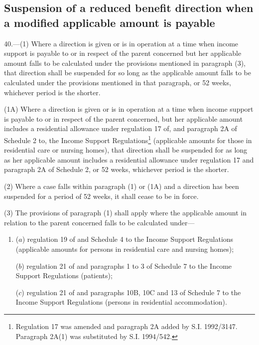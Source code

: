 \documentclass[a4paper,12pt]{article}
\begin{document}

\subsection[40. Suspension of a reduced benefit direction when a modified applicable amount is payable]{Suspension of a reduced benefit direction when a modified applicable amount is payable}

40.—(1) Where a direction is given or is in operation at a time when income support is payable to or in respect of the parent concerned but her applicable amount falls to be calculated under the provisions mentioned in paragraph (3), that direction shall be suspended for so long as the applicable amount falls to be calculated under the provisions mentioned in that paragraph, or 52 weeks, whichever period is the shorter.

(1A) Where a direction is given or is in operation at a time when income support is payable to or in respect of the parent concerned, but her applicable amount includes a residential allowance under regulation 17 of, and paragraph 2A of Schedule 2 to, the Income Support Regulations\footnote{\frenchspacing Regulation 17 was amended and paragraph 2A added by S.I. 1992/3147. Paragraph 2A(1) was substituted by S.I. 1994/542.} (applicable amounts for those in residential care or nursing homes), that direction shall be suspended for as long as her applicable amount includes a residential allowance under regulation 17 and paragraph 2A of Schedule 2, or 52 weeks, whichever period is the shorter.

(2) Where a case falls within paragraph (1) 
or (1A)  %
and a direction has been suspended for a period of 52 weeks, it shall cease to be in force.

(3) The provisions of paragraph (1) shall apply where the applicable amount in relation to the parent concerned falls to be calculated under—
\begin{enumerate}\item[]
($a$) regulation 19 of and Schedule 4 to the Income Support Regulations (applicable amounts for persons in residential care and nursing homes);

($b$) regulation 21 of and paragraphs 1 to 3 of Schedule 7 to the Income Support Regulations (patients);

($c$) regulation 21 of and paragraphs 10B, 10C
and 13 of Schedule 7 to the Income Support Regulations (persons in residential accommodation).
\end{enumerate}
\end{document}
